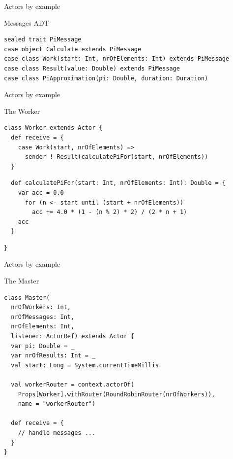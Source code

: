\begin{frame}[fragile]{Actors by example}
\begin{exampleblock}{Messages ADT}
\begin{lstlisting}
sealed trait PiMessage
case object Calculate extends PiMessage
case class Work(start: Int, nrOfElements: Int) extends PiMessage
case class Result(value: Double) extends PiMessage
case class PiApproximation(pi: Double, duration: Duration)
\end{lstlisting}
\end{exampleblock}
\end{frame}

\begin{frame}[fragile]{Actors by example}
\begin{exampleblock}{The Worker}
\begin{lstlisting}
class Worker extends Actor {
  def receive = {
    case Work(start, nrOfElements) =>
      sender ! Result(calculatePiFor(start, nrOfElements))
  }
\end{lstlisting}
\begin{lstlisting}
  def calculatePiFor(start: Int, nrOfElements: Int): Double = {
    var acc = 0.0
      for (n <- start until (start + nrOfElements))
        acc += 4.0 * (1 - (n % 2) * 2) / (2 * n + 1)
    acc
  }
\end{lstlisting}
\begin{lstlisting}
}
\end{lstlisting}
\end{exampleblock}
\end{frame}

\begin{frame}[fragile]{Actors by example}
\begin{exampleblock}{The Master}
\begin{lstlisting}
class Master(
  nrOfWorkers: Int,
  nrOfMessages: Int,
  nrOfElements: Int,
  listener: ActorRef) extends Actor {
  var pi: Double = _
  var nrOfResults: Int = _
  val start: Long = System.currentTimeMillis
     
  val workerRouter = context.actorOf(
    Props[Worker].withRouter(RoundRobinRouter(nrOfWorkers)),
    name = "workerRouter")
     
  def receive = {
    // handle messages ...
  } 
}
\end{lstlisting}
\end{exampleblock}
\end{frame}

